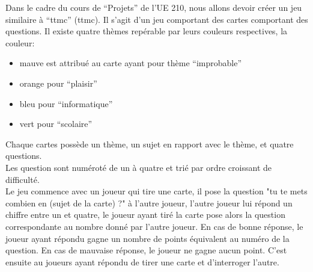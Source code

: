 Dans le cadre du cours de ``Projets'' de l'UE 210, nous allons devoir créer un jeu similaire à ``\acrlong{ttmc}'' (\acrshort{ttmc}). Il s'agit d'un jeu comportant des cartes comportant des questions. Il existe quatre thèmes repérable par leurs couleurs respectives, la couleur:
\begin{itemize}
	\item mauve est attribué au carte ayant pour thème ``improbable''
	\item orange pour ``plaisir''
	\item bleu pour ``informatique''
	\item vert pour ``scolaire''
\end{itemize}
Chaque cartes possède un thème, un sujet en rapport avec le thème, et quatre questions.\\
Les question sont numéroté de un à quatre et trié par ordre croissant de difficulté.\\
Le jeu commence avec un joueur qui tire une carte, il pose la question "tu te mets combien en (sujet de la carte) ?" à l'autre joueur, l'autre joueur lui répond un chiffre entre un et quatre, le joueur ayant tiré la carte pose alors la question correspondante au nombre donné par l'autre joueur. En cas de bonne réponse, le joueur ayant répondu gagne un nombre de points équivalent au numéro de la question. En cas de mauvaise réponse, le joueur ne gagne aucun point. C'est ensuite au joueurs ayant répondu de tirer une carte et d'interroger l'autre.


